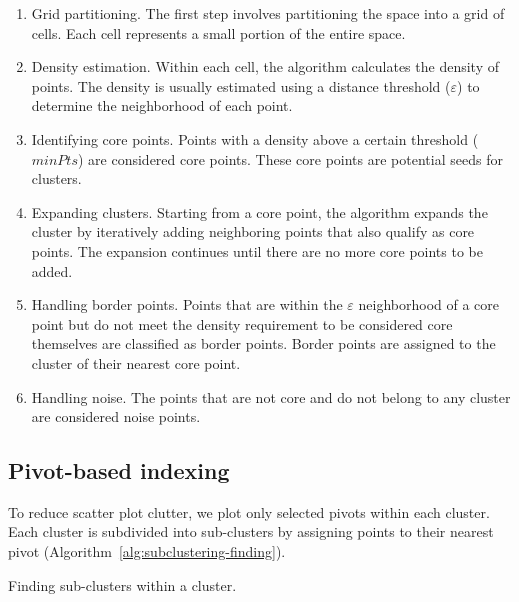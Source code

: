 \begin{enumerate}
    \item Grid partitioning. The first step involves partitioning the space into a grid of cells. Each cell represents a small portion of the entire space.

    \item Density estimation. Within each cell, the algorithm calculates the density of points. The density is usually estimated using a distance threshold ($\varepsilon$) to determine the neighborhood of each point.

    \item Identifying core points. Points with a density above a certain threshold ($minPts$) are considered core points. These core points are potential seeds for clusters.

    \item Expanding clusters. Starting from a core point, the algorithm expands the cluster by iteratively adding neighboring points that also qualify as core points. The expansion continues until there are no more core points to be added.

    \item Handling border points. Points that are within the $\varepsilon$ neighborhood of a core point but do not meet the density requirement to be considered core themselves are classified as border points. Border points are assigned to the cluster of their nearest core point.

    \item Handling noise. The points that are not core and do not belong to any cluster are considered noise points.
\end{enumerate}

\subsection{Pivot-based indexing}
\label{subsect:pivot-based-indexing}

To reduce scatter plot clutter, we plot only selected pivots within each cluster. Each cluster is subdivided into sub-clusters by assigning points to their nearest pivot (Algorithm~\ref{alg:subclustering-finding}).

\begin{algorithm}
    \caption{Finding sub-clusters within a cluster.}
    \label{alg:subclustering-finding}
\end{algorithm}

